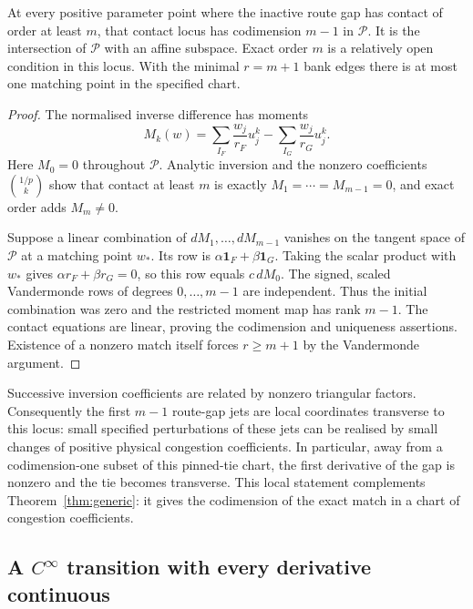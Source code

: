 \begin{proposition}\label{prop:codimension}
At every positive parameter point where the inactive route gap has contact of order at least $m$, that contact locus has codimension $m-1$ in $\mathcal P$. It is the intersection of $\mathcal P$ with an affine subspace. Exact order $m$ is a relatively open condition in this locus. With the minimal $r=m+1$ bank edges there is at most one matching point in the specified chart.
\end{proposition}
\begin{proof}
The normalised inverse difference has moments
\begin{equation}
 M_k(w)=\sum_{I_F}\frac{w_j}{r_F}u_j^k-
        \sum_{I_G}\frac{w_j}{r_G}u_j^k.
\end{equation}
Here $M_0=0$ throughout $\mathcal P$. Analytic inversion and the nonzero coefficients $\binom{1/p}{k}$ show that contact at least $m$ is exactly $M_1=\cdots=M_{m-1}=0$, and exact order adds $M_m\ne0$.

Suppose a linear combination of $dM_1,\ldots,dM_{m-1}$ vanishes on the tangent space of $\mathcal P$ at a matching point $w_*$. Its row is $\alpha\mathbf1_F+\beta\mathbf1_G$. Taking the scalar product with $w_*$ gives $\alpha r_F+\beta r_G=0$, so this row equals $c\,dM_0$. The signed, scaled Vandermonde rows of degrees $0,\ldots,m-1$ are independent. Thus the initial combination was zero and the restricted moment map has rank $m-1$. The contact equations are linear, proving the codimension and uniqueness assertions. Existence of a nonzero match itself forces $r\ge m+1$ by the Vandermonde argument.
\end{proof}

Successive inversion coefficients are related by nonzero triangular factors. Consequently the first $m-1$ route-gap jets are local coordinates transverse to this locus: small specified perturbations of these jets can be realised by small changes of positive physical congestion coefficients. In particular, away from a codimension-one subset of this pinned-tie chart, the first derivative of the gap is nonzero and the tie becomes transverse. This local statement complements Theorem~\ref{thm:generic}: it gives the codimension of the exact match in a chart of congestion coefficients.


\subsection{A \texorpdfstring{$C^\infty$}{C-infinity} transition with every derivative continuous}

